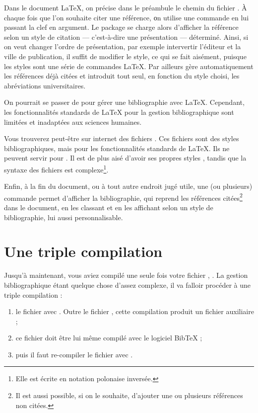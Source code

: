 Dans le document \LaTeX{}, on précise dans le préambule le chemin du fichier . À chaque fois que l'on souhaite citer une référence, οn utilise une commande en lui passant la clef en argument. Le package  se charge alors d'afficher la référence selon un style de citation --- c’est-à-dire une présentation --- déterminé. Ainsi, si on veut changer l'ordre de présentation, par exemple intervertir l'éditeur et la ville de publication, il suffit de modifier le style, ce qui se fait aisément, puisque les styles sont une série de commandes \LaTeX{}. Par ailleurs  gère automatiquement les références déjà citées et introduit tout seul, en fonction du style choisi, les abréviations universitaires. 

\begin{plusloins}

On pourrait se passer de   pour gérer une bibliographie avec \LaTeX{}. Cependant, les fonctionnalités standards de \LaTeX{} pour la gestion bibliographique sont limitées et inadaptées aux sciences humaines. 

Vous trouverez peut-être sur internet des fichiers . Ces fichiers sont des styles bibliographiques, mais pour les fonctionnalités standards de \LaTeX{}. Ils ne peuvent servir pour . Il est de plus aisé d'avoir ses propres styles , tandis que la syntaxe des fichiers  est complexe\footnote{Elle est écrite en notation polonaise inversée.}.

\end{plusloins}

Enfin, à la fin du document, ou à tout autre endroit jugé utile, une (ou plusieurs) commande permet d'afficher la bibliographie, qui reprend les références citées\footnote{Il est aussi possible, si on le souhaite, d'ajouter une ou plusieurs références non citées.} dans le document, en les classant et en les affichant selon un style de bibliographie, lui aussi personnalisable.

\section{Une triple compilation}\label{3compil}

Jusqu'à maintenant, vous aviez compilé une seule fois votre fichier , \XeLaTeX. La gestion bibliographique étant quelque chose d'assez complexe, il va falloir procéder à une triple compilation :
\begin{enumerate}
\item le fichier  avec \XeLaTeX. Outre le fichier , cette compilation produit un fichier auxiliaire  ;
\item ce fichier doit être lui même compilé avec le logiciel BibTeX ;
\item puis il faut re-compiler le fichier  avec \XeLaTeX.
\end{enumerate}

